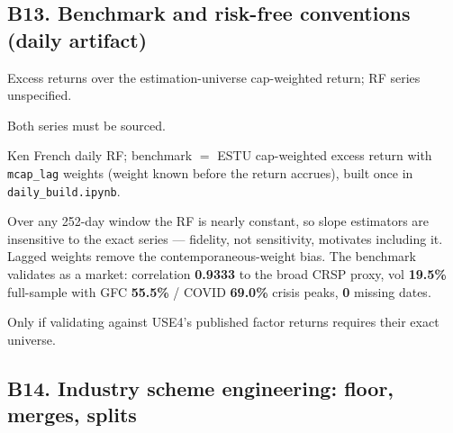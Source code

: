 \documentclass[11pt,a4paper]{article}
\begin{document}
\subsection{B13. Benchmark and risk-free conventions (daily artifact)}

\begin{description}[style=nextline]
  \item[USE4] Excess returns over the estimation-universe cap-weighted return;
    RF series unspecified.
  \item[Deviation] Both series must be sourced.
  \item[Solution] Ken French daily RF; benchmark $=$ ESTU cap-weighted excess
    return with \texttt{mcap\_lag} weights (weight known before the return
    accrues), built once in \texttt{daily\_build.ipynb}.
  \item[Validity] Over any 252-day window the RF is nearly constant, so slope
    estimators are insensitive to the exact series --- fidelity, not
    sensitivity, motivates including it. Lagged weights remove the
    contemporaneous-weight bias. The benchmark validates as a market:
    correlation \textbf{0.9333} to the broad CRSP proxy, vol \textbf{19.5\%}
    full-sample with GFC \textbf{55.5\%} / COVID \textbf{69.0\%} crisis peaks,
    \textbf{0} missing dates.
  \item[Revisit when] Only if validating against USE4's published factor
    returns requires their exact universe.
\end{description}


\subsection{B14. Industry scheme engineering: floor, merges, splits}
\end{document}
